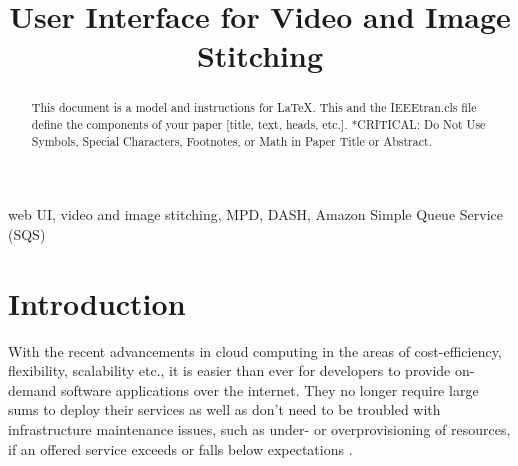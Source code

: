 \documentclass[conference]{IEEEtran}
\begin{document}
\title{User Interface for Video and Image Stitching}

\author{
\and
{}
\and
{}
}

\maketitle

\begin{abstract}
This document is a model and instructions for \LaTeX.
This and the IEEEtran.cls file define the components of your paper [title, text, heads, etc.]. *CRITICAL: Do Not Use Symbols, Special Characters, Footnotes, 
or Math in Paper Title or Abstract.
\end{abstract}

\begin{IEEEkeywords}
web UI, video and image stitching, MPD, DASH, Amazon Simple Queue Service (SQS)
\end{IEEEkeywords}

\section{Introduction}
With the recent advancements in cloud computing in the areas of cost-efficiency, flexibility, scalability etc., it is easier than ever for developers to provide on-demand software applications over the internet.
They no longer require large sums to deploy their services as well as don't need to be troubled with infrastructure maintenance issues, such as under- or overprovisioning of resources, if an offered service exceeds or falls below expectations \cite{Fox}.
\end{document}
